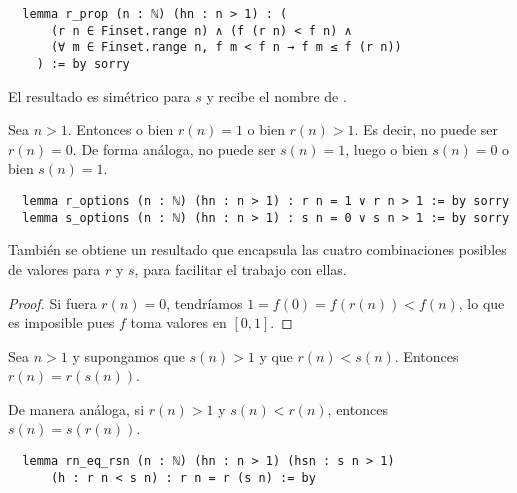 \begin{lstlisting}
  lemma r_prop (n : ℕ) (hn : n > 1) : (
      (r n ∈ Finset.range n) ∧ (f (r n) < f n) ∧
      (∀ m ∈ Finset.range n, f m < f n → f m ≤ f (r n))
    ) := by sorry
\end{lstlisting}

El resultado es simétrico para $s$ y recibe el nombre de .

\begin{lemma}
  Sea $n > 1$. Entonces o bien $r(n) = 1$ o bien $r(n) > 1$. Es decir, no puede ser $r(n) = 0$. De forma análoga, no puede ser $s(n) = 1$, luego o bien $s(n) = 0$ o bien $s(n) = 1$.
\end{lemma}

\begin{lstlisting}
  lemma r_options (n : ℕ) (hn : n > 1) : r n = 1 ∨ r n > 1 := by sorry
  lemma s_options (n : ℕ) (hn : n > 1) : s n = 0 ∨ s n > 1 := by sorry
\end{lstlisting}

También se obtiene un resultado  que encapsula las cuatro combinaciones posibles de valores para $r$ y $s$, para facilitar el trabajo con ellas.

\begin{proof}
  Si fuera $r(n) = 0$, tendríamos $1 = f(0) = f(r(n)) < f(n)$, lo que es imposible pues $f$ toma valores en $[0, 1]$.
\end{proof}

\begin{lemma}
  Sea $n > 1$ y supongamos que $s(n) > 1$ y que $r(n) < s(n)$. Entonces $r(n) = r(s(n))$.

  De manera análoga, si $r(n) >1$ y $s(n) < r(n)$, entonces $s(n) = s(r(n))$.
\end{lemma}

\begin{lstlisting}
  lemma rn_eq_rsn (n : ℕ) (hn : n > 1) (hsn : s n > 1)
      (h : r n < s n) : r n = r (s n) := by
\end{lstlisting}


